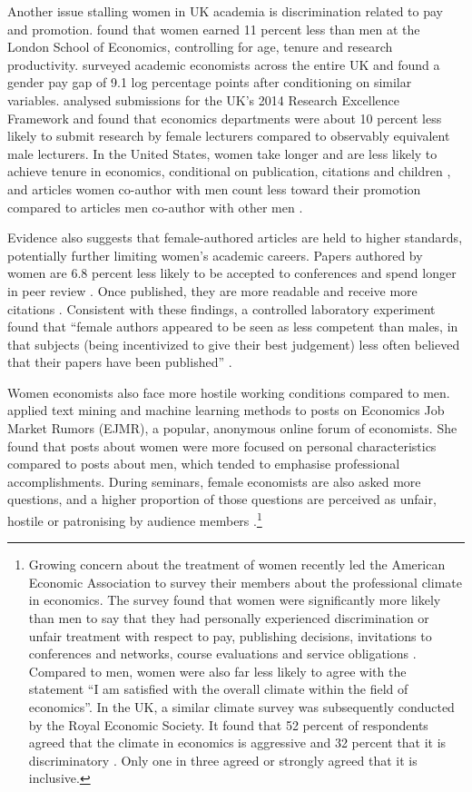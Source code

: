 \documentclass[a4paper, 1]{article}
\begin{document}
Another issue stalling women in UK academia is discrimination related to pay and promotion. \citet{Bandiera2016} found that women earned 11 percent less than men at the London School of Economics, controlling for age, tenure and research productivity. \citet{Mumford2019} surveyed academic economists across the entire UK and found a gender pay gap of 9.1 log percentage points after conditioning on similar variables. \citet{McManus2018} analysed submissions for the UK's 2014 Research Excellence Framework and found that economics departments were about 10 percent less likely to submit research by female lecturers compared to observably equivalent male lecturers. In the United States, women take longer and are less likely to achieve tenure in economics, conditional on publication, citations and children \citep{Ginther2014}, and articles women co-author with men count less toward their promotion compared to articles men co-author with other men \citep{Sarsons2021}.

Evidence also suggests that female-authored articles are held to higher standards, potentially further limiting women's academic careers. Papers authored by women are 6.8 percent less likely to be accepted to conferences \citep{Hospido2021} and spend longer in peer review \citep{Hengel2022, Alexander2021}. Once published, they are more readable and receive more citations \citep{Card2020, Hengel2022, Moon2022, Grossbard2021}. Consistent with these findings, a controlled laboratory experiment found that ``female authors appeared to be seen as less competent than males, in that subjects (being incentivized to give their best judgement) less often believed that their papers have been published'' \citep[p.~326]{Krawczyk2016}.

Women economists also face more hostile working conditions compared to men. \citet{Wu2020} applied text mining and machine learning methods to posts on Economics Job Market Rumors (EJMR), a popular, anonymous online forum of economists. She found that posts about women were more focused on personal characteristics compared to posts about men, which tended to emphasise professional accomplishments. During seminars, female economists are also asked more questions, and a higher proportion of those questions are perceived as unfair, hostile or patronising by audience members \citep{Dupas2021}.\footnote{Growing concern about the treatment of women recently led the American Economic Association to survey their members about the professional climate in economics. The survey found that women were significantly more likely than men to say that they had personally experienced discrimination or unfair treatment with respect to pay, publishing decisions, invitations to conferences and networks, course evaluations and service obligations \citep{AEA2019}. Compared to men, women were also far less likely to agree with the statement ``I am satisfied with the overall climate within the field of economics''. In the UK, a similar climate survey was subsequently conducted by the Royal Economic Society. It found that 52 percent of respondents agreed that the climate in economics is aggressive and 32 percent that it is discriminatory \citep{RES2020}. Only one in three agreed or strongly agreed that it is inclusive.}
\end{document}
